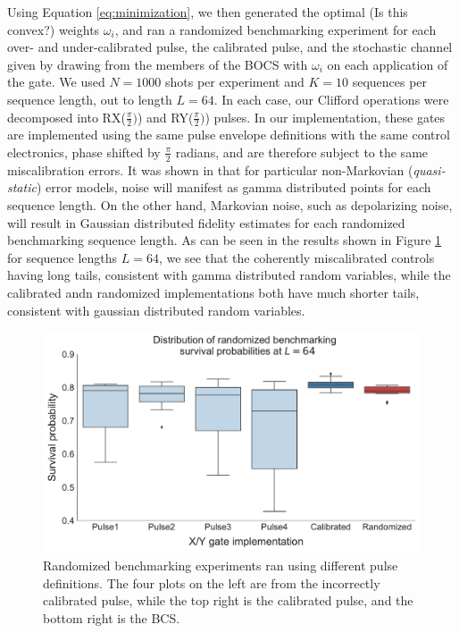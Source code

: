\documentclass[aps,nofootinbib,pra,notitlepage,twocolumn]{revtex4-1}
\begin{document}
Using Equation \ref{eq:minimization}, we then generated the optimal (Is this convex?) weights $\omega_i$, and ran a randomized benchmarking experiment for each over- and under-calibrated pulse, the calibrated pulse, and the stochastic channel given by drawing from the members of the BOCS with $\omega_i$ on each application of the gate. We used $N=1000$ shots per experiment and $K=10$ sequences per sequence length, out to length $L=64$\cite{Magesan2011}. In each case, our Clifford operations were decomposed into RX($\frac{\pi}{2})$) and RY($\frac{\pi}{2})$) pulses. In our implementation, these gates are implemented using the same pulse envelope definitions with the same control electronics, phase shifted by $\frac{\pi}{2}$ radians, and are therefore subject to the same miscalibration errors.
 It was shown in \cite{Ball2016} that for particular non-Markovian (\textit{quasi-static}) error models, noise will manifest as gamma distributed points for each sequence length. On the other hand, Markovian noise, such as depolarizing noise, will result in Gaussian distributed fidelity estimates for each randomized benchmarking sequence length. As can be seen in the results shown in Figure \ref{fig:rb} for sequence lengths $L=64$, we see that the coherently miscalibrated controls having long tails, consistent with gamma distributed random variables, while the calibrated andn randomized implementations both have much shorter tails, consistent with gaussian distributed random variables. 

\begin{figure}[H]
  \centering
  \includegraphics[width=\columnwidth]{rb_data.pdf}
  \caption{Randomized benchmarking experiments ran using different pulse definitions. The four plots on the left are from the incorrectly calibrated pulse, while the top right is the calibrated pulse, and the bottom right is the BCS.}
  \label{fig:rb}
\end{figure}
\end{document}
